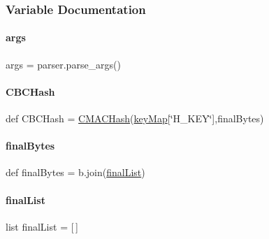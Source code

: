 \subsubsection{Variable Documentation}
\mbox{\label{namespacefw__protect_a8187411843a6284ffb964ef3fb9fcab3}} 
\paragraph{\texorpdfstring{args}{args}}
{\footnotesize\ttfamily args = parser.\+parse\+\_\+args()}

\mbox{\label{namespacefw__protect_a4cbff5b07c2bcf804fb1261c803951a4}} 
\paragraph{\texorpdfstring{C\+B\+C\+Hash}{CBCHash}}
{\footnotesize\ttfamily def C\+B\+C\+Hash = \hyperlink{namespacefw__protect_a54f5aa6464f7083b24fed44f31279165}{C\+M\+A\+C\+Hash}(\hyperlink{namespacefw__protect_a2b7d0c72182cc690371be6f920f0eba2}{key\+Map}\mbox{[}\char`\"{}H\+\_\+\+K\+EY\char`\"{}\mbox{]},final\+Bytes)}

\mbox{\label{namespacefw__protect_ab9b7930b3f30906e28d6e0294d700e07}} 
\paragraph{\texorpdfstring{final\+Bytes}{finalBytes}}
{\footnotesize\ttfamily def final\+Bytes = b\textquotesingle{}\textquotesingle{}.join(\hyperlink{namespacefw__protect_a27b60b34da7ce48640b2398f069b82d2}{final\+List})}

\mbox{\label{namespacefw__protect_a27b60b34da7ce48640b2398f069b82d2}} 
\paragraph{\texorpdfstring{final\+List}{finalList}}
{\footnotesize\ttfamily list final\+List = \mbox{[}$\,$\mbox{]}}

